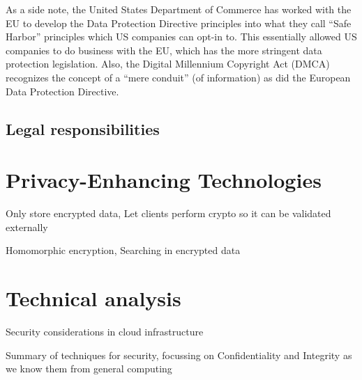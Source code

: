 \documentclass[11pt]{article}
\begin{document}
As a side note, the United States Department of Commerce has worked with the EU to develop the Data Protection Directive principles into what they call ``Safe Harbor'' principles which US companies can opt-in to.
This essentially allowed US companies to do business with the EU, which has the more stringent data protection legislation.
Also, the Digital Millennium Copyright Act (DMCA) recognizes the concept of a ``mere conduit'' (of information) as did the European Data Protection Directive. \cite{congress1998digital}






\subsection{Legal responsibilities}


\section{Privacy-Enhancing Technologies}
\label{sec:pet}
Only store encrypted data, Let clients perform crypto so it can be validated externally
\cite{kamara2010cryptographic}

Homomorphic encryption,
Searching in encrypted data \cite{harrower2009searching, li2010fuzzy}

\section{Technical analysis}
\label{sec:technical_analysis}
Security considerations in cloud infrastructure

Summary of techniques for security, focussing on Confidentiality and Integrity as we know them from general computing
\end{document}
